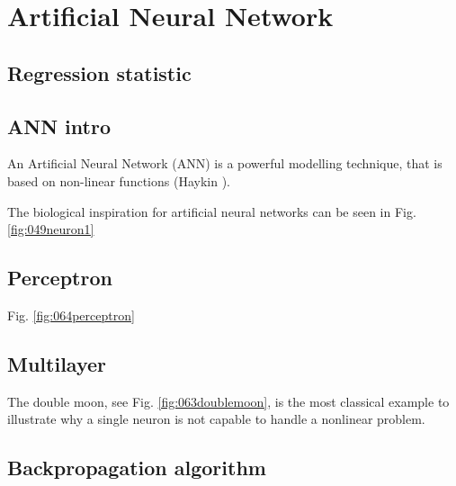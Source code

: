 
\chapter{Artificial Neural Network}
\label{cap:ann}

\section{Regression statistic}
\label{sec:regressionstatistic}

\section{ANN intro}
\label{sec:annintro}

An Artificial Neural Network (\acs{ANN}) is a powerful modelling technique, 
that is based on non-linear functions (Haykin \cite{RefWorks:158}). 


The biological inspiration for artificial neural networks can be seen in Fig.
\ref{fig:049neuron1}



\section{Perceptron}
\label{sec:perceptron}

Fig. \ref{fig:064perceptron}\\


\section{Multilayer}
\label{sec:multilayer}

The double moon, see Fig. \ref{fig:063doublemoon}, is the most classical
example  to illustrate why a single neuron is not capable to handle a
nonlinear problem.\\


\section{Backpropagation algorithm}
\label{sec:backpropagationalgorithm}

